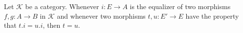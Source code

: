 Let $\mathcal{K}$ be a category. Whenever $i: E \longrightarrow A$ is the equalizer of two morphisms $f, g: A \longrightarrow B$ in $\mathcal{K}$ and whenever two morphisms $t, u: E' \longrightarrow E$ have the property that $t.i = u.i$, then $t = u$.
